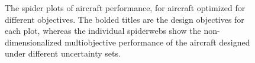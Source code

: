 \begin{figure}
    \begin{center}
    \caption{The spider plots of aircraft performance, for aircraft optimized for different objectives.
    The bolded titles are the design objectives for each plot, whereas the individual spiderwebs
    show the non-dimensionalized multiobjective performance of the aircraft designed under different
    uncertainty sets.}
    \label{fig:spider}
\end{center}
\end{figure}

